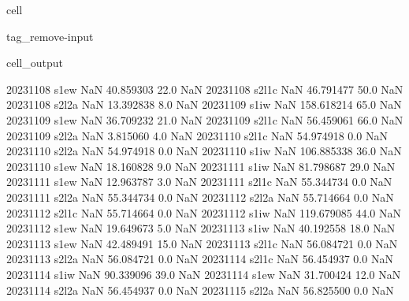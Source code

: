 \documentclass[letterpaper,10pt,english]{jupyterBook}
\begin{document}
\begin{sphinxuseclass}{cell}
\begin{sphinxuseclass}{tag_remove-input}
\begin{sphinxVerbatimOutput}
\begin{sphinxuseclass}{cell_output}
\begin{sphinxVerbatim}[commandchars=\\\{\}]
2023\PYGZhy{}11\PYGZhy{}08        s1\PYGZus{}ew           NaN   40.859303    22.0         NaN
2023\PYGZhy{}11\PYGZhy{}08       s2\PYGZus{}l1c           NaN   46.791477    50.0         NaN
2023\PYGZhy{}11\PYGZhy{}08       s2\PYGZus{}l2a           NaN   13.392838     8.0         NaN
2023\PYGZhy{}11\PYGZhy{}09        s1\PYGZus{}iw           NaN  158.618214    65.0         NaN
2023\PYGZhy{}11\PYGZhy{}09        s1\PYGZus{}ew           NaN   36.709232    21.0         NaN
2023\PYGZhy{}11\PYGZhy{}09       s2\PYGZus{}l1c           NaN   56.459061    66.0         NaN
2023\PYGZhy{}11\PYGZhy{}09       s2\PYGZus{}l2a           NaN    3.815060     4.0         NaN
2023\PYGZhy{}11\PYGZhy{}10       s2\PYGZus{}l1c           NaN   54.974918     0.0         NaN
2023\PYGZhy{}11\PYGZhy{}10       s2\PYGZus{}l2a           NaN   54.974918     0.0         NaN
2023\PYGZhy{}11\PYGZhy{}10        s1\PYGZus{}iw           NaN  106.885338    36.0         NaN
2023\PYGZhy{}11\PYGZhy{}10        s1\PYGZus{}ew           NaN   18.160828     9.0         NaN
2023\PYGZhy{}11\PYGZhy{}11        s1\PYGZus{}iw           NaN   81.798687    29.0         NaN
2023\PYGZhy{}11\PYGZhy{}11        s1\PYGZus{}ew           NaN   12.963787     3.0         NaN
2023\PYGZhy{}11\PYGZhy{}11       s2\PYGZus{}l1c           NaN   55.344734     0.0         NaN
2023\PYGZhy{}11\PYGZhy{}11       s2\PYGZus{}l2a           NaN   55.344734     0.0         NaN
2023\PYGZhy{}11\PYGZhy{}12       s2\PYGZus{}l2a           NaN   55.714664     0.0         NaN
2023\PYGZhy{}11\PYGZhy{}12       s2\PYGZus{}l1c           NaN   55.714664     0.0         NaN
2023\PYGZhy{}11\PYGZhy{}12        s1\PYGZus{}iw           NaN  119.679085    44.0         NaN
2023\PYGZhy{}11\PYGZhy{}12        s1\PYGZus{}ew           NaN   19.649673     5.0         NaN
2023\PYGZhy{}11\PYGZhy{}13        s1\PYGZus{}iw           NaN   40.192558    18.0         NaN
2023\PYGZhy{}11\PYGZhy{}13        s1\PYGZus{}ew           NaN   42.489491    15.0         NaN
2023\PYGZhy{}11\PYGZhy{}13       s2\PYGZus{}l1c           NaN   56.084721     0.0         NaN
2023\PYGZhy{}11\PYGZhy{}13       s2\PYGZus{}l2a           NaN   56.084721     0.0         NaN
2023\PYGZhy{}11\PYGZhy{}14       s2\PYGZus{}l1c           NaN   56.454937     0.0         NaN
2023\PYGZhy{}11\PYGZhy{}14        s1\PYGZus{}iw           NaN   90.339096    39.0         NaN
2023\PYGZhy{}11\PYGZhy{}14        s1\PYGZus{}ew           NaN   31.700424    12.0         NaN
2023\PYGZhy{}11\PYGZhy{}14       s2\PYGZus{}l2a           NaN   56.454937     0.0         NaN
2023\PYGZhy{}11\PYGZhy{}15       s2\PYGZus{}l2a           NaN   56.825500     0.0         NaN

\end{sphinxVerbatim}
\end{sphinxuseclass}
\end{sphinxVerbatimOutput}
\end{sphinxuseclass}
\end{sphinxuseclass}
\end{document}
